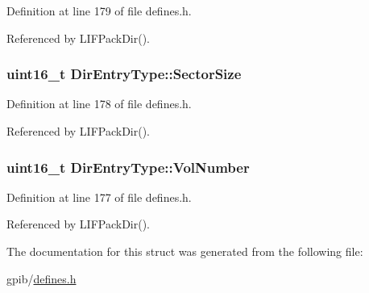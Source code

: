 Definition at line 179 of file defines.\+h.



Referenced by L\+I\+F\+Pack\+Dir().

\subsubsection[{\texorpdfstring{Sector\+Size}{SectorSize}}]{\setlength{\rightskip}{0pt plus 5cm}uint16\+\_\+t Dir\+Entry\+Type\+::\+Sector\+Size}\hypertarget{structDirEntryType_ab92ab53cd08e0ffe0f0098c583ce5eba}{}\label{structDirEntryType_ab92ab53cd08e0ffe0f0098c583ce5eba}


Definition at line 178 of file defines.\+h.



Referenced by L\+I\+F\+Pack\+Dir().

\subsubsection[{\texorpdfstring{Vol\+Number}{VolNumber}}]{\setlength{\rightskip}{0pt plus 5cm}uint16\+\_\+t Dir\+Entry\+Type\+::\+Vol\+Number}\hypertarget{structDirEntryType_a2fe2eefd68aafcce0bb14bf53e4cba00}{}\label{structDirEntryType_a2fe2eefd68aafcce0bb14bf53e4cba00}


Definition at line 177 of file defines.\+h.



Referenced by L\+I\+F\+Pack\+Dir().



The documentation for this struct was generated from the following file\+:\begin{DoxyCompactItemize}
\item 
gpib/\hyperlink{defines_8h}{defines.\+h}\end{DoxyCompactItemize}
